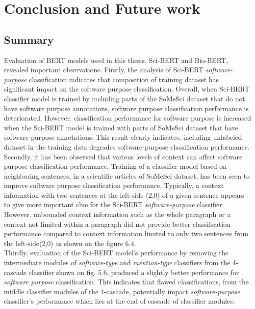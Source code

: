 \chapter{Conclusion and Future work}
\label{ch:chapter07}
 
%
%

\section{Summary }
\label{sec:chapter06:summary}

Evaluation of \ac{BERT} models used in this thesis, \ac{Sci-BERT} and \ac{Bio-BERT}, revealed important observations. Firstly, the analysis of Sci-BERT \emph{software-purpose} classification indicates that composition of training dataset has significant impact on the software purpose classification. Overall, when Sci-BERT classifier model is trained by including parts of the SoMeSci dataset that do not have software purpose annotations, software purpose classification performance is deteriorated. However, classification performance for software purpose is increased when the Sci-BERT model is trained with parts of \ac{SoMeSci} dataset that have software-purpose annotations. This result clearly indicates, including unlabeled dataset in the training data degrades software-purpose classification performance.  \\

Secondly, it has been observed that various levels of context can affect software purpose classification performance. Training of a classifier model based on neighboring sentences, in a scientific articles of SoMeSci dataset, has been seen to improve software purpose classification performance. Typically, a context information with two sentences at the left-side (2,0) of a given sentence appears to give more important clue for the \ac{Sci-BERT} \emph{software-purpose} classifier. However, unbounded context information such as the whole paragraph or a context not limited within a paragraph did not provide better classification performance compared to context information limited to only two sentences from the left-side(2,0) as shown on the figure 6.4. \\


Thirdly, evaluation of the Sci-BERT model's performance by removing the intermediate modules of \emph{software-type} and \emph{mention-type} classifiers from the 4-cascade classifier shown on fig. 5.6, produced a slightly better performance for \emph{software purpose} classification.  This indicates that flawed classifications, from the middle classifier modules of the 4-cascade, potentially impact \emph{software-purpose} classifier's performance which lies at the end of cascade of classifier modules. \\

